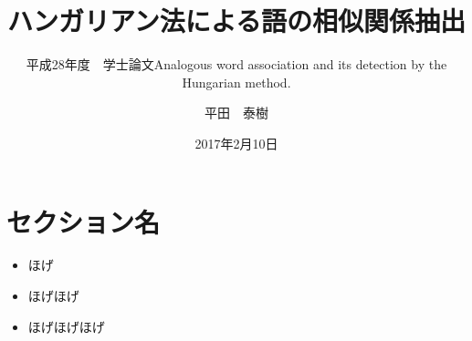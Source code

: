 \documentclass[slide,papersize]{jsarticle}
\begin{document}
\subtitle{平成28年度　学士論文}
\title{ハンガリアン法による語の相似関係抽出}
\subtitle{Analogous word association and its detection by the Hungarian method.}
\author{平田　泰樹}
\date{2017年2月10日}
\maketitle



\section{セクション名}

\begin{itemize}
\item ほげ
\item ほげほげ
\item ほげほげほげ
\end{itemize}
\end{document}
